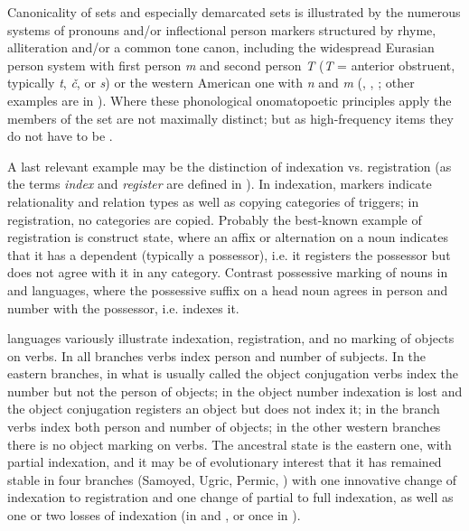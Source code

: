 \documentclass[output=paper,hidelinks]{langscibook}
\begin{document}
Canonicality of sets and especially demarcated sets is illustrated by the numerous systems of pronouns and/or inflectional person markers structured by rhyme, alliteration and/or a common tone canon, including the widespread Eurasian person system with first person \textit{m} and second person \textit{T} (\textit{T} = anterior obstruent, typically \textit{t}, \textit{č}, or \textit{s}) or the western American one with \textit{n} and \textit{m} (\citealt{Nichols1996}, \citealt{NicholsPeterson2013}, \citealt{NicholsPeterson2013a}; other examples are in \citealt{Nichols2001,Nichols2012,Nichols2013}).  Where these phonological onomatopoetic principles apply the members of the set are not maximally distinct; but as high-frequency items they do not have to be \citep[100--129]{Meylan2018}.

A last relevant example may be the distinction of indexation vs. registration (as the terms \textit{index} and \textit{register} are defined in \citealt[48--49]{Nichols1992}). In indexation, markers indicate relationality and relation types as well as copying categories of triggers; in registration, no categories are copied.  Probably the best-known example of registration is  construct state, where an affix or alternation on a noun indicates that it has a dependent (typically a possessor), i.e. it registers the possessor but does not agree with it in any category.  Contrast possessive marking of nouns in  and  languages, where the possessive suffix on a head noun agrees in person and number with the possessor, i.e. indexes it.  

 languages variously illustrate indexation, registration, and no marking of objects on verbs.  In all branches verbs index person and number of subjects.  In the eastern branches, in what is usually called the object conjugation verbs index the number but not the person of objects; in  the object number indexation is lost and the object conjugation registers an object but does not index it; in the  branch verbs index both person and number of objects; in the other western branches there is no object marking on verbs.  The ancestral state is the eastern one, with partial indexation, and it may be of evolutionary interest that it has remained stable in four branches (Samoyed, Ugric, Permic, ) with one innovative change of indexation to registration and one change of partial to full indexation, as well as one or two losses of indexation (in  and , or once in ). 
\end{document}
